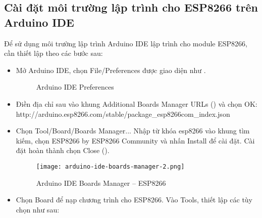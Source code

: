 \subsection{Cài đặt môi trường lập trình cho ESP8266 trên Arduino IDE}
    Để sử dụng môi trường lập trình Arduino IDE lập trình cho module ESP8266, cần thiết lập theo các bước sau:
        \begin{itemize}
            \item Mở Arduino IDE, chọn File/Preferences được giao diện như \fig{\ref{Fig:Preferences-2-Arduino-IDE}}.
                \begin{figure}[htp]
                    \begin{center}
                        \hspace{.5cm}
                    \end{center}
                    \caption{Arduino IDE Preferences}\label{Fig:Preferences-Arduino-IDE}
                \end{figure}
            \item Điền địa chỉ sau vào khung Additional Boards Manager URLs (\fig{\ref{Fig:Preferences-3-Arduino-IDE}}) và chọn OK: http://arduino.esp8266.com/stable/package\_esp8266com\_index.json
            \item Chọn Tool/Board/Boards Manager... Nhập từ khóa esp8266 vào khung tìm kiếm, chọn ESP8266 by ESP8266 Community và nhấn Install để cài đặt. Cài đặt hoàn thành chọn Close (\fig{\ref{Fig:Boards-Manager-Arduino-IDE}}).
                \begin{figure}[htp]
                    \begin{center}
                        \texttt{[image: arduino-ide-boards-manager-2.png]}
                    \end{center}
                    \caption{Arduino IDE Boards Manager -- ESP8266} \label{Fig:Boards-Manager-Arduino-IDE}
                \end{figure}
            \item Chọn Board để nạp chương trình cho ESP8266. Vào Tools, thiết lập các tùy chọn như sau:

\end{itemize}
